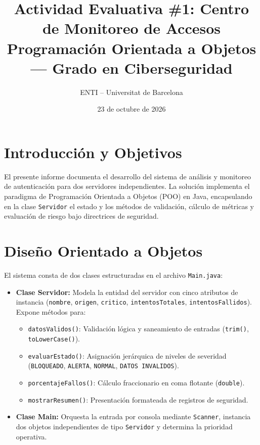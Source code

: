 \documentclass[11pt,a4paper]{article}
\title{\textbf{Actividad Evaluativa \#1: Centro de Monitoreo de Accesos}\\ \large Programación Orientada a Objetos --- Grado en Ciberseguridad}
\author{ENTI -- Universitat de Barcelona}
\date{23 de octubre de 2026}
\begin{document}
\maketitle

\section{Introducción y Objetivos}
El presente informe documenta el desarrollo del sistema de análisis y monitoreo de autenticación para dos servidores independientes. La solución implementa el paradigma de Programación Orientada a Objetos (POO) en Java, encapsulando en la clase \texttt{Servidor} el estado y los métodos de validación, cálculo de métricas y evaluación de riesgo bajo directrices de seguridad.

\section{Diseño Orientado a Objetos}
El sistema consta de dos clases estructuradas en el archivo \texttt{Main.java}:
\begin{itemize}
    \item \textbf{Clase Servidor:} Modela la entidad del servidor con cinco atributos de instancia (\texttt{nombre}, \texttt{origen}, \texttt{critico}, \texttt{intentosTotales}, \texttt{intentosFallidos}). Expone métodos para:
    \begin{itemize}
        \item \texttt{datosValidos()}: Validación lógica y saneamiento de entradas (\texttt{trim()}, \texttt{toLowerCase()}).
        \item \texttt{evaluarEstado()}: Asignación jerárquica de niveles de severidad (\texttt{BLOQUEADO}, \texttt{ALERTA}, \texttt{NORMAL}, \texttt{DATOS INVALIDOS}).
        \item \texttt{porcentajeFallos()}: Cálculo fraccionario en coma flotante (\texttt{double}).
        \item \texttt{mostrarResumen()}: Presentación formateada de registros de seguridad.
    \end{itemize}
    \item \textbf{Clase Main:} Orquesta la entrada por consola mediante \texttt{Scanner}, instancia dos objetos independientes de tipo \texttt{Servidor} y determina la prioridad operativa.
\end{itemize}
\end{document}
